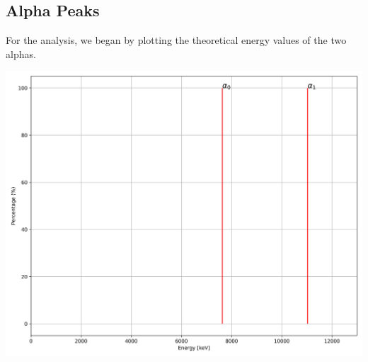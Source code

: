 \documentclass{article}
\begin{document}
\begin{multicols}{2}
%
%
%
%
%
%

\section{Alpha Peaks}
    \label{sec:alphapeaks}

For the analysis, we began by plotting the theoretical energy values of the two alphas.

\begin{center}
    \label{alfa_peaks}
    \centering
    \includegraphics[scale = 0.3]{../../images/AlphaPeaks.jpeg}
\end{center}


\end{multicols}
\end{document}
